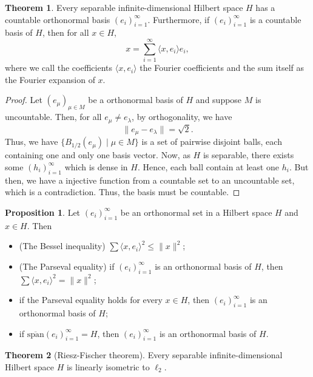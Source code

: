 \documentclass[
]{article}
\theoremstyle{definition}
\newtheorem{theorem}{Theorem}
\theoremstyle{definition}
\newtheorem{proposition}{Proposition}[section]
\begin{document}
\begin{theorem}
  Every separable infinite-dimensional Hilbert space \(H\) has a countable 
  orthonormal basis \((e_i)_{i = 1}^\infty\). Furthermore, if \((e_i)_{i = 1}^\infty\) 
  is a countable basis of \(H\), then for all \(x \in H\), 
  \[x = \sum_{i = 1}^\infty \langle x, e_i \rangle e_i,\]
  where we call the coefficients \(\langle x, e_i \rangle\) the Fourier 
  coefficients and the sum itself as the Fourier expansion of \(x\).
\end{theorem}
\begin{proof}
  Let \((e_\mu)_{\mu \in M}\) be a orthonormal basis of \(H\) and suppose \(M\) 
  is uncountable. Then, for all \(e_\mu \neq e_\lambda\), by orthogonality, we 
  have 
  \[\| e_\mu - e_\lambda \| = \sqrt{2}.\]
  Thus, we have \(\{ B_{1/2}(e_\mu) \mid \mu \in M \}\) is a set of pairwise disjoint 
  balls, each containing one and only one basis vector. Now, as \(H\) is separable, 
  there exists some \((h_i)_{i = 1}^\infty\) which is dense in \(H\). Hence, 
  each ball contain at least one \(h_i\). But then, we have a injective function 
  from a countable set to an uncountable set, which is a contradiction. Thus, 
  the basis must be countable.
\end{proof}

\begin{proposition}
  Let \((e_i)_{i = 1}^\infty\) be an orthonormal set in a Hilbert space \(H\) and 
  \(x \in H\). Then 
  \begin{itemize}
    \item (The Bessel inequality) \(\sum \langle x, e_i \rangle^2 \le \|x\|^2\);
    \item (The Parseval equality) if \((e_i)_{i = 1}^\infty\) is an orthonormal 
      basis of \(H\), then \(\sum \langle x, e_i \rangle^2 = \|x\|^2\);
    \item if the Parseval equality holds for every \(x \in H\), then 
      \((e_i)_{i = 1}^\infty\) is an orthonormal basis of \(H\);
    \item if \(\overline{\text{span}}(e_i)_{i = 1}^\infty = H\), then 
      \((e_i)_{i = 1}^\infty\) is an orthonormal basis of \(H\).
  \end{itemize}
\end{proposition}

\begin{theorem}[Riesz-Fischer theorem]
  Every separable infinite-dimensional Hilbert space \(H\) is linearly isometric 
  to \(\ell_2\).
\end{theorem}
\end{document}
